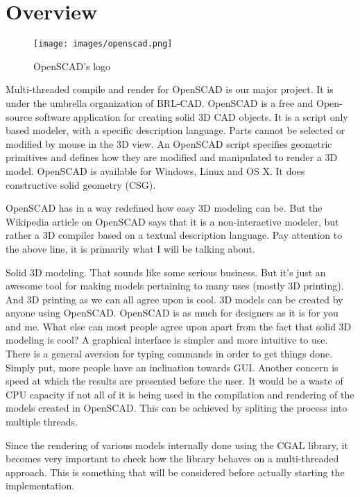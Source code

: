 \section{Overview}
\begin{figure}[H] 
	\centering \texttt{[image: images/openscad.png]}
	\caption{OpenSCAD's logo}
	\label{fig:openscadlogo}
\end{figure}
Multi-threaded compile and render for OpenSCAD is our major project. It is under the umbrella organization of BRL-CAD. OpenSCAD is a free and Open-source software application for creating solid 3D CAD objects. It is a script only based modeler, with a specific description language. Parts cannot be selected or modified by mouse in the 3D view. An OpenSCAD script specifies geometric primitives and defines how they are modified and manipulated to render a 3D model. OpenSCAD is available for Windows, Linux and OS X. It does constructive solid geometry (CSG).

OpenSCAD has in a way redefined how easy 3D modeling can be. But the Wikipedia article on OpenSCAD says that it is a non-interactive modeler, but rather a 3D compiler based on a textual description language. Pay attention to the above line, it is primarily what I will be talking about.

Solid 3D modeling. That sounds like some serious business. But it's just an awesome tool for making models pertaining to many uses (mostly 3D printing). And 3D printing as we can all agree upon is cool. 3D models can be created by anyone using OpenSCAD. OpenSCAD is as much for designers as it is for you and me. What else can most people agree upon apart from the fact that solid 3D modeling is cool? A graphical interface is simpler and more intuitive to use. There is a general aversion for typing commands in order to get things done. Simply put, more people have an inclination towards GUI. Another concern is speed at which the results are presented before the user. It would be a waste of CPU capacity if not all of it is being used in the compilation and rendering of the models created in OpenSCAD. This can be achieved by spliting the process into multiple threads.

Since the rendering of various models internally done using the CGAL library, it becomes very important to check how the library behaves on a multi-threaded approach. This is something that will be considered before actually starting the implementation.

